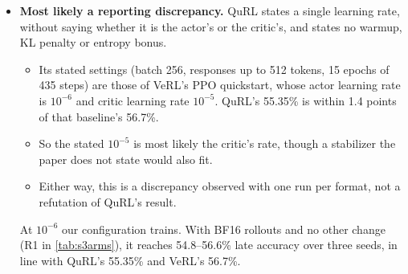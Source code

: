 \begin{itemize}[leftmargin=*,itemsep=2pt]
\item \textbf{Most likely a reporting discrepancy.} QuRL states a single learning rate, without saying whether it is the actor's or the critic's, and states no warmup, KL penalty or entropy bonus.
  \begin{itemize}[leftmargin=*,itemsep=1pt]
  \item Its stated settings (batch 256, responses up to 512 tokens, 15 epochs of 435 steps) are those of VeRL's PPO quickstart, whose actor learning rate is $10^{-6}$ and critic learning rate $10^{-5}$. QuRL's 55.35\% is within 1.4 points of that baseline's 56.7\%.
  \item So the stated $10^{-5}$ is most likely the critic's rate, though a stabilizer the paper does not state would also fit.
  \item Either way, this is a discrepancy observed with one run per format, not a refutation of QuRL's result.
  \end{itemize}
  At $10^{-6}$ our configuration trains. With BF16 rollouts and no other change (R1 in \cref{tab:s3arms}), it reaches 54.8--56.6\% late accuracy over three seeds, in line with QuRL's 55.35\% and VeRL's 56.7\%.
\end{itemize}

